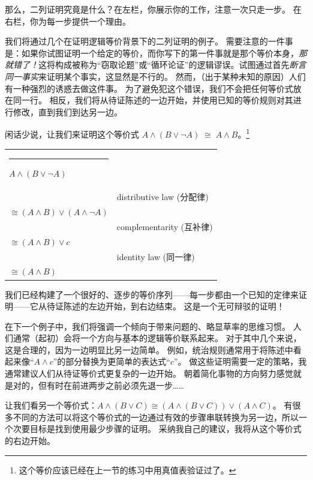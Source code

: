 那么，二列证明究竟是什么？在左栏，你展示你的工作，注意一次只走一步。
在右栏，你为每一步提供一个理由。

我们将通过几个在证明逻辑等价背景下的二列证明的例子。
需要注意的一件事是：如果你试图证明一个给定的等价，而你写下的第一件事就是那个等价本身，\emph{那就错了！}这将构成被称为“窃取论题”或“循环论证”的逻辑谬误。试图通过首先\emph{断言同一事实}来证明某个事实，这显然是不行的。
然而，（出于某种未知的原因）人们有一种强烈的诱惑去做这件事。
为了避免犯这个错误，我们不会把任何等价式放在同一行。
相反，我们将从待证陈述的一边开始，并使用已知的等价规则对其进行修改，直到我们到达另一边。

闲话少说，让我们来证明这个等价式 $A \land (B \lor {\lnot}A) \; \cong \; A \land B $。\footnote{这个等价应该已经在上一节的练习中用真值表验证过了。}
\medskip

\begin{center}
\begin{tabular}{p{2in}p{2in}}
\rule{10pt}{0pt} $A \land (B \lor {\lnot}A)$ & \\
 & distributive law (分配律)\\
$\cong (A \land B) \lor (A \land {\lnot}A)$ & \\
 & complementarity (互补律)\\
$\cong (A \land B) \lor c$ & \\
 & identity law (同一律)\\
$\cong (A \land B)$ & \\
\end{tabular}
\end{center}
\medskip

我们已经构建了一个很好的、逐步的等价序列——每一步都由一个已知的定律来证明——它从待证陈述的左边开始，到右边结束。
这是一个无可辩驳的证明！

在下一个例子中，我们将强调一个倾向于带来问题的、略显草率的思维习惯。
人们通常（起初）会将一个方向与基本的逻辑等价联系起来。
对于其中几个来说，这是合理的，因为一边明显比另一边简单。
例如，统治规则通常用于将陈述中看起来像“$A \land c$”的部分替换为更简单的表达式“$c$”。
做这些证明需要一定的策略，我通常建议人们从待证等价式更复杂的一边开始。
朝着简化事物的方向努力感觉就是对的，但有时在前进两步之前必须先退一步……

让我们看另一个等价式：$A \land (B \lor C) \cong (A \land (B \lor C)) \lor (A \land C)$。
有很多不同的方法可以将这个等价式的一边通过有效的步骤串联转换为另一边，所以一个次要目标是找到使用最少步骤的证明。
采纳我自己的建议，我将从这个等价式的右边开始。


